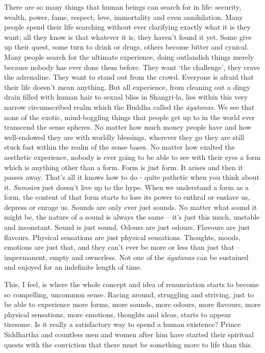 There are so many things that human beings can search for in life:
security, wealth, power, fame, respect, love, immortality and even
annihilation. Many people spend their life searching without ever
clarifying exactly what it is they want; all they know is that whatever
it is, they haven't found it yet. Some give up their quest, some turn to
drink or drugs, others become bitter and cynical. Many people search for
the ultimate experience, doing outlandish things merely because nobody
has ever done them before. They want `the challenge', they crave the
adrenaline. They want to stand out from the crowd. Everyone is afraid
that their life doesn't mean anything. But all experience, from cleaning
out a dingy drain filled with human hair to sexual bliss in Shangri-la,
lies within this very narrow circumscribed realm which the Buddha called
the \emph{āyatanas}. We see that none of the exotic, mind-boggling
things that people get up to in the world ever transcend the sense
spheres. No matter how much money people have and how well-endowed they
are with worldly blessings, wherever they go they are still stuck fast
within the realm of the sense bases. No matter how exalted the aesthetic
experience, nobody is ever going to be able to see with their eyes a
form which is anything other than a form. Form is just form. It arises
and then it passes away. That's all it knows how to do - quite pathetic
when you think about it. \emph{Samsāra} just doesn't live up to the
hype. When we understand a form as a form, the content of that form
starts to lose its power to enthral or enslave us, depress or enrage us.
Sounds are only ever just sounds. No matter what sound it might be, the
nature of a sound is always the same -- it's just this much, unstable
and inconstant. Sound is just sound. Odours are just odours. Flavours
are just flavours. Physical sensations are just physical sensations.
Thoughts, moods, emotions are just that, and they can't ever be more or
less than just that -- impermanent, empty and ownerless. Not one of the
\emph{āyatanas} can be sustained and enjoyed for an indefinite length of
time.

This, I feel, is where the whole concept and idea of renunciation starts
to become so compelling, uncommon sense. Racing around, struggling and
striving, just to be able to experience more forms, more sounds, more
odours, more flavours, more physical sensations, more emotions, thoughts
and ideas, starts to appear tiresome. Is it really a satisfactory way to
spend a human existence? Prince Siddhartha and countless men and women
after him have started their spiritual quests with the conviction that
there must be something more to life than this.

